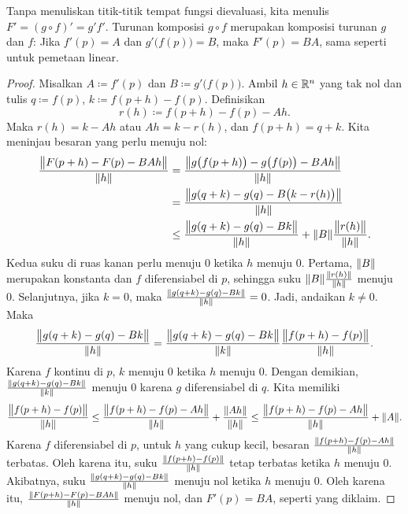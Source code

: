 Tanpa menuliskan titik-titik tempat fungsi dievaluasi, kita menulis
$F' = {(g \circ f)}' = g' f'$.
Turunan komposisi $g \circ f$
merupakan komposisi turunan $g$ dan $f$:
Jika $f'(p) = A$ dan $g'\bigl(f(p)\bigr) = B$, maka $F'(p) = BA$,
sama seperti untuk pemetaan linear.

\begin{proof}
Misalkan $A \coloneqq f'(p)$ dan $B \coloneqq g'\bigl(f(p)\bigr)$.  Ambil $h \in {\mathbb{R}}^n$ yang tak nol
dan tulis $q \coloneqq f(p)$, $k \coloneqq f(p+h)-f(p)$.  Definisikan
\begin{equation*}
r(h) \coloneqq f(p+h)-f(p) - A h . %
\end{equation*}
Maka $r(h) = k-Ah$ atau $Ah = k-r(h)$, dan $f(p+h) = q+k$.
Kita meninjau besaran yang perlu
menuju nol:
\begin{equation*}
\begin{split}
\frac{\bigl\lVert {F(p+h)-F(p) - BAh} \bigr\rVert}{\lVert {h} \rVert}
& =
\frac{\bigl\lVert {g\bigl(f(p+h)\bigr)-g\bigl(f(p)\bigr) - BAh} \bigr\rVert}{\lVert {h} \rVert}
\\
& =
\frac{\bigl\lVert {g(q+k)-g(q) - B\bigl(k-r(h)\bigr)} \bigr\rVert}{\lVert {h} \rVert}
\\
& \leq
\frac
{\bigl\lVert {g(q+k)-g(q) - Bk} \bigr\rVert}
{\lVert {h} \rVert}
+
\lVert {B} \rVert
\frac
{\bigl\lVert {r(h)} \bigr\rVert}
{\lVert {h} \rVert}
.
\end{split}
\end{equation*}
Kedua suku di ruas kanan perlu menuju 0
ketika $h$ menuju 0.
Pertama, $\lVert {B} \rVert$ merupakan konstanta dan $f$ diferensiabel di $p$,
sehingga
suku $\lVert {B} \rVert\frac{\lVert {r(h)} \rVert}{\lVert {h} \rVert}$ menuju 0.
Selanjutnya,
jika $k=0$, maka
$\frac
{\lVert {g(q+k)-g(q) - Bk} \rVert}
{\lVert {h} \rVert} = 0$.
Jadi, andaikan $k \neq 0$.
Maka
\begin{equation*}
\frac
{\bigl\lVert {g(q+k)-g(q) - Bk} \bigr\rVert}
{\lVert {h} \rVert}
 =
\frac
{\bigl\lVert {g(q+k)-g(q) - Bk} \bigr\rVert}
{\lVert {k} \rVert}
\frac
{\bigl\lVert {f(p+h)-f(p)} \bigr\rVert}
{\lVert {h} \rVert} .
\end{equation*}
Karena $f$ kontinu di $p$,
$k$ menuju 0 ketika $h$ menuju 0.
Dengan demikian,
$\frac
{\lVert {g(q+k)-g(q) - Bk} \rVert}
{\lVert {k} \rVert}$ menuju 0 karena $g$ diferensiabel di $q$.
Kita memiliki
\begin{equation*}
\frac
{\bigl\lVert {f(p+h)-f(p)} \bigr\rVert}
{\lVert {h} \rVert}
\leq
\frac
{\bigl\lVert {f(p+h)-f(p)-Ah} \bigr\rVert}
{\lVert {h} \rVert}
+
\frac
{\lVert {Ah} \rVert}
{\lVert {h} \rVert}
\leq
\frac
{\bigl\lVert {f(p+h)-f(p)-Ah} \bigr\rVert}
{\lVert {h} \rVert}
+
\lVert {A} \rVert .
\end{equation*}
Karena $f$ diferensiabel di $p$,
untuk $h$ yang cukup kecil, besaran
$\frac{\lVert {f(p+h)-f(p)-Ah} \rVert}{\lVert {h} \rVert}$ terbatas.  Oleh karena itu,
suku
$
\frac
{\lVert {f(p+h)-f(p)} \rVert}
{\lVert {h} \rVert}
$
tetap terbatas ketika $h$ menuju 0.
Akibatnya, suku
$\frac
{\lVert {g(q+k)-g(q) - Bk} \rVert}
{\lVert {h} \rVert}$ menuju nol ketika $h$ menuju 0.
Oleh karena itu,
$\frac{\lVert {F(p+h)-F(p) - BAh} \rVert}{\lVert {h} \rVert}$ menuju nol, dan
$F'(p) = BA$, seperti yang diklaim.
\end{proof}

